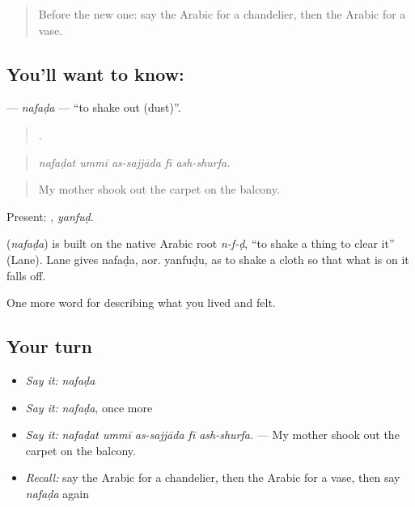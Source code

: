 \label{lesson:AR-C550-nafada}



\begin{quote}
Before the new one: say the Arabic for a chandelier, then the Arabic for a vase.
\end{quote}

\subsection*{You'll want to know: }
\textbf{} — \emph{nafaḍa} — \textquotedblleft{}to shake out (dust)\textquotedblright{}.

\begin{quote}
    .
\end{quote}

\begin{quote}
\emph{nafaḍat ummī as-sajjāda fī ash-shurfa.}
\end{quote}

\begin{quote}
My mother shook out the carpet on the balcony.
\end{quote}

Present: , \emph{yanfuḍ}.

\begin{cousinweb}
\textbf{} (\emph{nafaḍa}) is built on the native Arabic root \emph{n-f-ḍ}, \textquotedblleft{}to shake a thing to clear it\textquotedblright{} (Lane). Lane gives nafaḍa, aor. yanfuḍu, as to shake a cloth so that what is on it falls off.
\end{cousinweb}

\begin{grammarlens}[title={What you've built}]
One more word for describing what you lived and felt.
\end{grammarlens}

\subsection*{Your turn}
\begin{itemize}
\raggedright
  \item \emph{Say it:} \emph{nafaḍa}
  \item \emph{Say it:} \emph{nafaḍa}, once more
  \item \emph{Say it:} \emph{nafaḍat ummī as-sajjāda fī ash-shurfa.} — My mother shook out the carpet on the balcony.
  \item \emph{Recall:} say the Arabic for a chandelier, then the Arabic for a vase, then say \emph{nafaḍa} again
\end{itemize}

